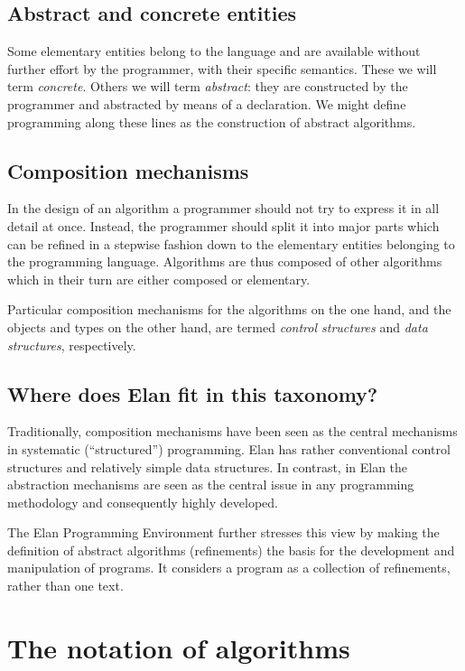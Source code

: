 \subsection{Abstract and concrete entities}

Some elementary entities belong to the language and are available
without further effort by the programmer, with their specific
semantics. These we will term {\em concrete}. Others we will
term {\em abstract}: they are constructed by the programmer and
abstracted by means of a declaration. We might define programming
along these lines as the construction
of abstract algorithms.

\subsection{Composition mechanisms}

In the design of an algorithm a programmer should not try to
express it in all detail at once. Instead, the programmer should
split it into major parts which can be refined in a stepwise
fashion down to the elementary entities belonging to the programming
language. Algorithms are thus composed of other algorithms which
in their turn are either composed or elementary.

Particular composition mechanisms for the algorithms on the one
hand, and the objects and types on the other hand, are termed
{\em control structures} and {\em data structures}, respectively.

\subsection{Where does Elan fit in this taxonomy?}

Traditionally, composition mechanisms have been seen as the
central mechanisms in systematic (``structured'') programming.
Elan has rather conventional control structures and relatively
simple data structures. In contrast, in Elan the abstraction mechanisms
are seen as the central issue in any programming methodology
and consequently highly developed.

The Elan Programming Environment further stresses this view
by making the definition of abstract algorithms (refinements)
the basis for the development and manipulation of programs. It
considers a program as a collection of refinements, rather than
one text.

\section{The notation of algorithms}

